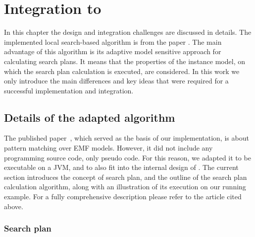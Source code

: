 \chapter{Integration to \eiq}
\label{chap:integration}


In this chapter the design and integration challenges are discussed in details. The implemented local search-based algorithm is from the paper \cite{DBLP:journals/sosym/VarroDWS15}. The main advantage of this algorithm is its adaptive model sensitive approach for calculating search plans. It means that the properties of the instance model, on which the search plan calculation is executed, are considered. In this work we only introduce the main differences and key ideas that were required for a successful implementation and integration.

\section{Details of the adapted algorithm}
\label{sec:details}



The published paper~\cite{DBLP:journals/sosym/VarroDWS15}, which served as the basis of our implementation, is about pattern matching over EMF models. However, it did not include any programming source code, only pseudo code. For this reason, we adapted it to be executable on a JVM, and to also fit into the internal design of \eiq. The current section introduces the concept of search plan, and the outline of the search plan calculation algorithm, along with an illustration of its execution on our running example. For a fully comprehensive description please refer to the article cited above.


\subsection{Search plan}
\label{sec:localsearch}
	 
